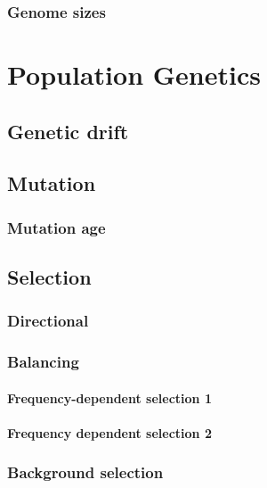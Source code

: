 \documentclass[]{book}
\theoremstyle{definition}
\theoremstyle{definition}
\theoremstyle{definition}
\theoremstyle{remark}
\begin{document}
\section{Genome sizes}\label{genome-sizes}

\part{Population Genetics}\label{part-population-genetics}

\chapter{Genetic drift}\label{genetic-drift}

\chapter{Mutation}\label{mutation}

\section{Mutation age}\label{mutation-age}

\chapter{Selection}\label{selection-1}

\section{Directional}\label{directional}

\section{Balancing}\label{balancing}

\subsection{Frequency-dependent selection
1}\label{frequency-dependent-selection-1}

\subsection{Frequency dependent selection
2}\label{frequency-dependent-selection-2}

\section{Background selection}\label{background-selection}
\end{document}
